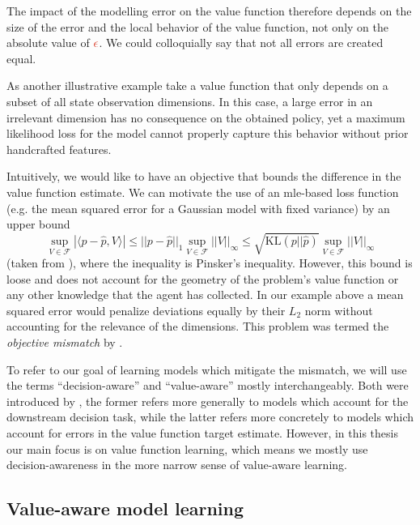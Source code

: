The impact of the modelling error on the value function therefore depends on the size of the error and the local behavior of the value function, not only on the absolute value of ${\color{uoftred}\epsilon}$. 
We could colloquially say that not all errors are created equal.

As another illustrative example take a value function that only depends on a subset of all state observation dimensions. 
In this case, a large error in an irrelevant dimension has no consequence on the obtained policy, yet a maximum likelihood loss for the model cannot properly capture this behavior without prior handcrafted features.

Intuitively, we would like to have an objective that bounds the difference in the value function estimate.
We can motivate the use of an \ac{mle}-based loss function (e.g. the mean squared error for a Gaussian model with fixed variance) {by an upper bound}
$$\sup_{V \in \mathcal{F}}|\langle p - \hat{p}, V\rangle|\leq ||p - \hat{p}||_1 \sup_{V \in \mathcal{F}}||V||_\infty \leq \sqrt{\text{KL}(p||\hat{p})}\sup_{V \in \mathcal{F}}||V||_\infty$$ 
(taken from
\textcite{vaml}), where the inequality is Pinsker's inequality.
However, this bound is loose and does not account for the geometry of the problem's value function or any other knowledge that the agent has collected. 
In our example above a mean squared error would penalize deviations equally by their $L_2$ norm without accounting for the relevance of the dimensions.
This problem was termed the \emph{objective mismatch} by \textcite{lambert202objective}.

To refer to our goal of learning models which mitigate the mismatch, we will use the terms ``decision-aware'' and ``value-aware'' mostly interchangeably.
Both were introduced by \textcite{vaml}, the former refers more generally to models which account for the downstream decision task, while the latter refers more concretely to models which account for errors in the value function target estimate.
However, in this thesis our main focus is on value function learning, which means we mostly use decision-awareness in the more narrow sense of value-aware learning.

\subsection{Value-aware model learning}


